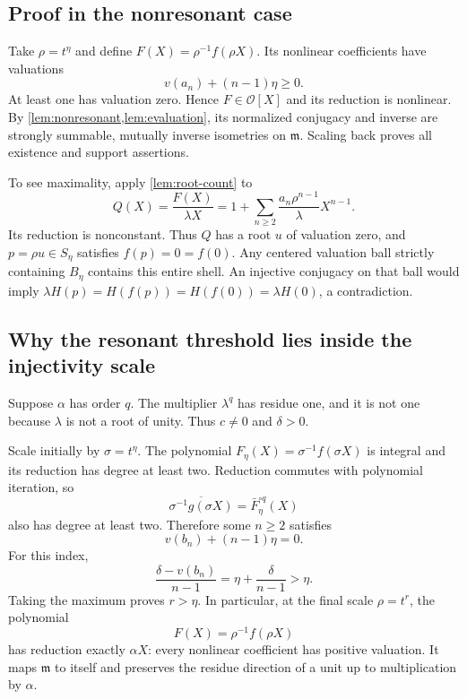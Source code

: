 \documentclass[11pt,letterpaper]{article}
\numberwithin{equation}{section}
\theoremstyle{plain}
\theoremstyle{definition}
\theoremstyle{remark}
\newcommand{\OO}{\mathcal O}
\newcommand{\mm}{\mathfrak m}
\begin{document}
\subsection{Proof in the nonresonant case}

Take $\rho=t^\eta$ and define $F(X)=\rho^{-1}f(\rho X)$. Its nonlinear
coefficients have valuations
\[
 v(a_n)+(n-1)\eta\ge0.
\]
At least one has valuation zero. Hence $F\in\OO[X]$ and its reduction is
nonlinear. By \cref{lem:nonresonant,lem:evaluation}, its normalized
conjugacy and inverse are strongly summable, mutually inverse isometries on
$\mm$. Scaling back proves all existence and support assertions.

To see maximality, apply \cref{lem:root-count} to
\[
 Q(X)=\frac{F(X)}{\lambda X}
     =1+\sum_{n\ge2}\frac{a_n\rho^{n-1}}{\lambda}X^{n-1}.
\]
Its reduction is nonconstant. Thus $Q$ has a root $u$ of valuation zero,
and $p=\rho u\in S_\eta$ satisfies $f(p)=0=f(0)$. Any centered valuation
ball strictly containing $B_\eta$ contains this entire shell. An injective
conjugacy on that ball would imply
$\lambda H(p)=H(f(p))=H(f(0))=\lambda H(0)$, a contradiction.

\subsection{Why the resonant threshold lies inside the injectivity scale}

Suppose $\alpha$ has order $q$. The multiplier $\lambda^q$ has residue one,
and it is not one because $\lambda$ is not a root of unity. Thus $c\ne0$
and $\delta>0$.

Scale initially by $\sigma=t^\eta$. The polynomial
$F_\eta(X)=\sigma^{-1}f(\sigma X)$ is integral and its reduction has degree
at least two. Reduction commutes with polynomial iteration, so
\[
 \overline{\sigma^{-1}g(\sigma X)}
       =\bar F_\eta^{\circ q}(X)
\]
also has degree at least two. Therefore some $n\ge2$ satisfies
\[
 v(b_n)+(n-1)\eta=0.
\]
For this index,
\[
 \frac{\delta-v(b_n)}{n-1}
    =\eta+\frac{\delta}{n-1}>\eta.
\]
Taking the maximum proves $r>\eta$. In particular, at the final scale
$\rho=t^r$, the polynomial
\begin{equation}\label{eq:F-scaled}
 F(X)=\rho^{-1}f(\rho X)
\end{equation}
has reduction exactly $\alpha X$: every nonlinear coefficient has positive
valuation. It maps $\mm$ to itself and preserves the residue direction of a
unit up to multiplication by $\alpha$.
\end{document}

